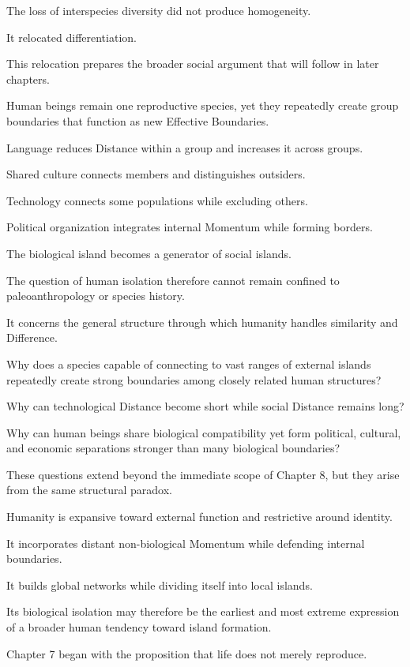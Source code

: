 The loss of interspecies diversity did not produce homogeneity.

It relocated differentiation.

This relocation prepares the broader social argument that will follow in later chapters.

Human beings remain one reproductive species, yet they repeatedly create group boundaries that function as new Effective Boundaries.

Language reduces Distance within a group and increases it across groups.

Shared culture connects members and distinguishes outsiders.

Technology connects some populations while excluding others.

Political organization integrates internal Momentum while forming borders.

The biological island becomes a generator of social islands.

The question of human isolation therefore cannot remain confined to paleoanthropology or species history.

It concerns the general structure through which humanity handles similarity and Difference.

Why does a species capable of connecting to vast ranges of external islands repeatedly create strong boundaries among closely related human structures?

Why can technological Distance become short while social Distance remains long?

Why can human beings share biological compatibility yet form political, cultural, and economic separations stronger than many biological boundaries?

These questions extend beyond the immediate scope of Chapter 8, but they arise from the same structural paradox.

Humanity is expansive toward external function and restrictive around identity.

It incorporates distant non-biological Momentum while defending internal boundaries.

It builds global networks while dividing itself into local islands.

Its biological isolation may therefore be the earliest and most extreme expression of a broader human tendency toward island formation.

Chapter 7 began with the proposition that life does not merely reproduce.

